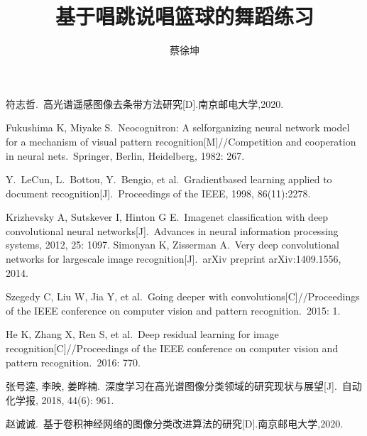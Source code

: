 \documentclass[UTF8,zihao=-4]{oucart}
\title{基于唱跳说唱篮球的舞蹈练习}
\author{蔡徐坤}
\begin{document}
    \makecover %
    \makesignature %
    \makeabstract %

    \thispagestyle{tableofcontents}
    \tableofcontents
    \newpage

    \setcounter{page}{1}


    
    \newpage
    
    \newpage

    \begin{thebibliography}{99}
        符志哲.\ 高光谱遥感图像去条带方法研究[D].南京邮电大学,2020.

        Fukushima K, Miyake S.\ Neocognitron: A self\-organizing neural network model for a mechanism of visual pattern recognition[M]//Competition and cooperation in neural nets.\ Springer, Berlin, Heidelberg, 1982: 267.

        Y.\ LeCun, L.\ Bottou, Y.\ Bengio, et al.\ Gradient\-based learning applied to document recognition[J].\ Proceedings of the IEEE, 1998, 86(11):2278.

        Krizhevsky A, Sutskever I, Hinton G E.\ Imagenet classification with deep convolutional neural networks[J].\ Advances in neural information processing systems, 2012, 25: 1097.
        Simonyan K, Zisserman A.\ Very deep convolutional networks for large\-scale image recognition[J].\ arXiv preprint arXiv:1409.1556, 2014.

        Szegedy C, Liu W, Jia Y, et al.\ Going deeper with convolutions[C]//Proceedings of the IEEE conference on computer vision and pattern recognition.\ 2015: 1.

        He K, Zhang X, Ren S, et al.\ Deep residual learning for image recognition[C]//Proceedings of the IEEE conference on computer vision and pattern recognition.\ 2016: 770.

        张号逵, 李映, 姜晔楠.\ 深度学习在高光谱图像分类领域的研究现状与展望[J].\ 自动化学报, 2018, 44(6): 961.

        赵诚诚.\ 基于卷积神经网络的图像分类改进算法的研究[D].南京邮电大学,2020.

    \end{thebibliography}
    \newpage
\end{document}
